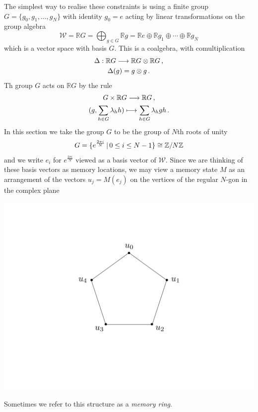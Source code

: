 \documentclass[english,letter paper,12pt,leqno]{article}
\theoremstyle{example}
\numberwithin{equation}{section}
\begin{document}
The simplest way to realise these constraints is using a finite group $G = \{ g_0, g_1,\ldots, g_N\}$ with identity $g_0 = e$ acting by linear transformations on the group algebra
\[
\mathscr{W} = \mathbb{R} G = \bigoplus_{g \in G} \mathbb{R} g = \mathbb{R} e \oplus \mathbb{R} g_1 \oplus \cdots \oplus \mathbb{R} g_N
\]
which is a vector space with basis $G$. This is a coalgebra, with comultiplication
\begin{gather*}
\Delta: \mathbb{R} G \longrightarrow \mathbb{R} G \otimes \mathbb{R} G\,,\\
\Delta(g) = g \otimes g\,.
\end{gather*}
Th group $G$ acts on $\mathbb{R} G$ by the rule
\begin{gather*}
G \times \mathbb{R} G \longrightarrow \mathbb{R} G\,,\\
(g, \sum_{h \in G} \lambda_h h ) \longmapsto \sum_{h \in G} \lambda_h gh\,.
\end{gather*}
In this section we take the group $G$ to be the group of $N$th roots of unity
\[
G = \{ e^{\frac{2\pi i}{N}} \,|\, 0 \le i \le N - 1 \} \cong \mathbb{Z}/N \mathbb{Z}
\]
and we write $e_i$ for $e^{\frac{2\pi i}{N}}$ viewed as a basis vector of $\mathscr{W}$. Since we are thinking of these basis vectors as memory locations, we may view a memory state $M$ as an arrangement of the vectors $u_j = M(e_j)$ on the vertices of the regular $N$-gon in the complex plane
\begin{center}
\includegraphics[scale=0.3]{dia1}
\end{center}
Sometimes we refer to this structure as a \emph{memory ring}.
\end{document}
